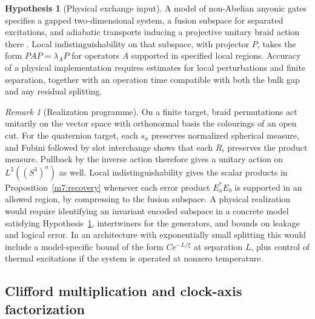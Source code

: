 \documentclass[11pt,reqno]{amsart}
\theoremstyle{definition}
\newtheorem{hypothesis}[theorem]{Hypothesis}
\theoremstyle{remark}
\newtheorem{remark}[theorem]{Remark}
\numberwithin{equation}{section}
\begin{document}
\begin{hypothesis}[Physical exchange input]\label{m7:anyons-input}
A model of non-Abelian anyonic gates specifies a gapped
two-dimensional system, a fusion subspace for separated excitations,
and adiabatic transports inducing a projective unitary braid action
there \cite{m7:Nayak}. Local indistinguishability on that subspace,
with projector $P$, takes the form $PAP=\lambda_A P$ for operators
$A$ supported in specified local regions. Accuracy of a physical
implementation requires estimates for local perturbations and
finite separation, together with an operation time compatible
with both the bulk gap and any residual splitting.
\end{hypothesis}

\begin{remark}[Realization programme]\label{m7:anyons-programme}
On a finite target, braid permutations act unitarily on the vector
space with orthonormal basis the colourings of an open cut. For the
quaternion target, each $s_x$ preserves normalized spherical measure,
and Fubini followed by slot interchange shows that each $R_i$
preserves the product measure. Pullback by the inverse action
therefore gives a unitary action on $L^2((S^3)^n)$ as well.
Local indistinguishability gives the scalar products in
Proposition~\ref{m7:recovery} whenever each error product $E_a^*E_b$
is supported in an allowed region, by compressing to the fusion
subspace. A physical realization would require identifying an invariant
encoded subspace in a concrete model satisfying
Hypothesis~\ref{m7:anyons-input}, intertwiners for the generators,
and bounds on leakage and logical error. In an architecture with
exponentially small splitting this would include a model-specific
bound of the form $C e^{-L/\xi}$ at separation $L$, plus control of
thermal excitations if the system is operated at nonzero temperature.
\end{remark}

\subsection{Clifford multiplication and clock-axis factorization}
\end{document}
